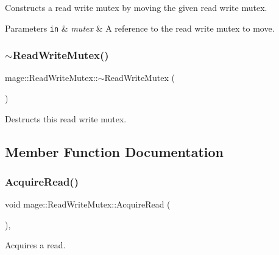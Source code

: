 Constructs a read write mutex by moving the given read write mutex.


\begin{DoxyParams}[1]{Parameters}
\mbox{\tt in}  & {\em mutex} & A reference to the read write mutex to move. \\
\hline
\end{DoxyParams}
\hypertarget{classmage_1_1_read_write_mutex_a73676d9414658d63edfe443ee1d55c8b}{}\label{classmage_1_1_read_write_mutex_a73676d9414658d63edfe443ee1d55c8b} 
\subsubsection{\texorpdfstring{$\sim$\+Read\+Write\+Mutex()}{~ReadWriteMutex()}}
{\footnotesize\ttfamily mage\+::\+Read\+Write\+Mutex\+::$\sim$\+Read\+Write\+Mutex (\begin{DoxyParamCaption}{ }\end{DoxyParamCaption})}

Destructs this read write mutex. 

\subsection{Member Function Documentation}
\hypertarget{classmage_1_1_read_write_mutex_add04196fda61967f81901bcba79938bc}{}\label{classmage_1_1_read_write_mutex_add04196fda61967f81901bcba79938bc} 
\subsubsection{\texorpdfstring{Acquire\+Read()}{AcquireRead()}}
{\footnotesize\ttfamily void mage\+::\+Read\+Write\+Mutex\+::\+Acquire\+Read (\begin{DoxyParamCaption}{ }\end{DoxyParamCaption})\hspace{0.3cm}{\ttfamily [private]}, {\ttfamily [noexcept]}}

Acquires a read. \hypertarget{classmage_1_1_read_write_mutex_ab99adb4241990fa0dd2d3ba03322d1c3}{}\label{classmage_1_1_read_write_mutex_ab99adb4241990fa0dd2d3ba03322d1c3} 
